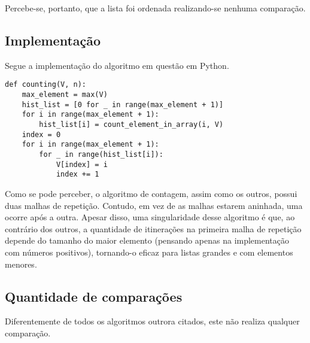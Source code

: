 Percebe-se, portanto, que a lista foi ordenada realizando-se nenhuma comparação.

\subsection{Implementação}
Segue a implementação do algoritmo em questão em Python.

\begin{lstlisting}
def counting(V, n):
    max_element = max(V)
    hist_list = [0 for _ in range(max_element + 1)]
    for i in range(max_element + 1):
        hist_list[i] = count_element_in_array(i, V)
    index = 0
    for i in range(max_element + 1):
        for _ in range(hist_list[i]):
            V[index] = i
            index += 1
\end{lstlisting}
Como se pode perceber, o algoritmo de contagem, assim como os outros, possui duas malhas de repetição. Contudo, em vez de as malhas estarem aninhada, uma ocorre após a outra.
Apesar disso, uma singularidade desse algoritmo é que, ao contrário dos outros, a quantidade de itinerações na primeira malha de repetição depende do tamanho do maior elemento (pensando apenas na implementação com números positivos), tornando-o eficaz para listas grandes e com elementos menores.

\subsection{Quantidade de comparações}
Diferentemente de todos os algoritmos outrora citados, este não realiza qualquer comparação.